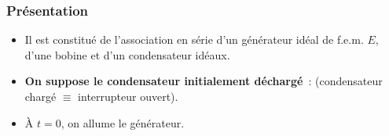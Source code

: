 \documentclass[../../main/main.tex]{subfiles}
\begin{document}
\subsubsection{Présentation}
\begin{minipage}[c]{.6\linewidth}
	\begin{itemize}
		\item Il est constitué de l'association en série d'un générateur idéal de
		      f.e.m. $E$, d'une bobine et d'un condensateur idéaux.
		\item \textbf{On suppose le condensateur initialement déchargé}~:
		       (condensateur chargé
		      $\equiv$ interrupteur ouvert).
		\item À $t=0$, on allume le générateur.
	\end{itemize}
\end{minipage}
\hfill
\begin{minipage}[c]{.35\linewidth}
	~
	\begin{center}
	\end{center}
\end{minipage}
\end{document}
